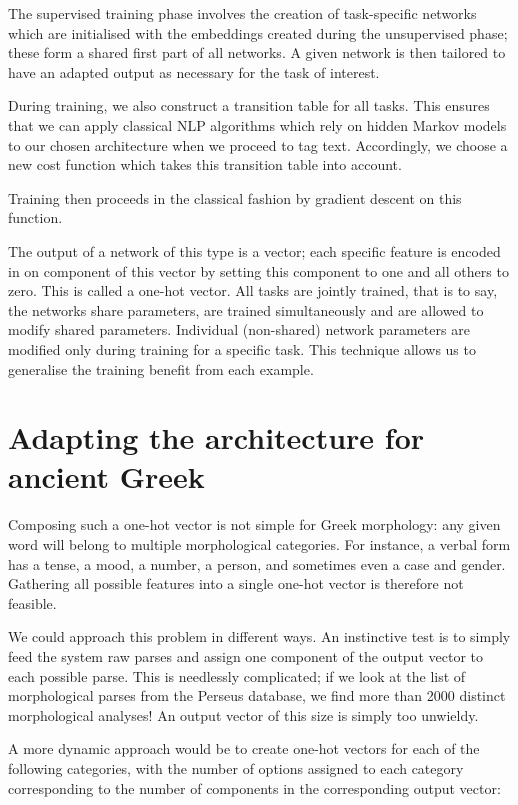The supervised training phase involves the creation of task-specific
networks which are initialised with the embeddings created during the
unsupervised phase; these form a shared first part of all networks. A
given network is then tailored to have an adapted output as necessary
for the task of interest. 

During training, we also construct a transition table for all
tasks. This ensures that we can apply classical NLP algorithms which
rely on hidden Markov models to our chosen architecture when we
proceed to tag text. Accordingly, we choose a new cost function which
takes this transition table into account.

Training then proceeds in the classical fashion by gradient descent on
this function.

The output of a network of this type is a vector; each specific
feature is encoded in on component of this vector by setting this
component to one and all others to zero. This is called a one-hot
vector. All tasks are jointly trained, that is to say, the networks
share parameters, are trained simultaneously and are allowed to modify
shared parameters. Individual (non-shared) network parameters are
modified only during training for a specific task. This technique
allows us to generalise the training benefit from each example.

\section{Adapting the architecture for ancient Greek}
\label{sec:adaptation}

Composing such a one-hot vector is not simple for Greek morphology:
any given word will belong to multiple morphological categories. For
instance, a verbal form has a tense, a mood, a number, a person, and
sometimes even a case and gender. Gathering all possible features into a
single one-hot vector is therefore not feasible.

We could approach this problem in different ways. An instinctive test
is to simply feed the system raw parses and assign one component of
the output vector to each possible parse. This is needlessly
complicated; if we look at the list of morphological parses from the
Perseus database, we find more than 2000 distinct morphological
analyses! An output vector of this size is simply too unwieldy.

A more dynamic approach would be to create one-hot vectors for each of
the following categories, with the number of options assigned to each
category corresponding to the number of components in the
corresponding output vector:

